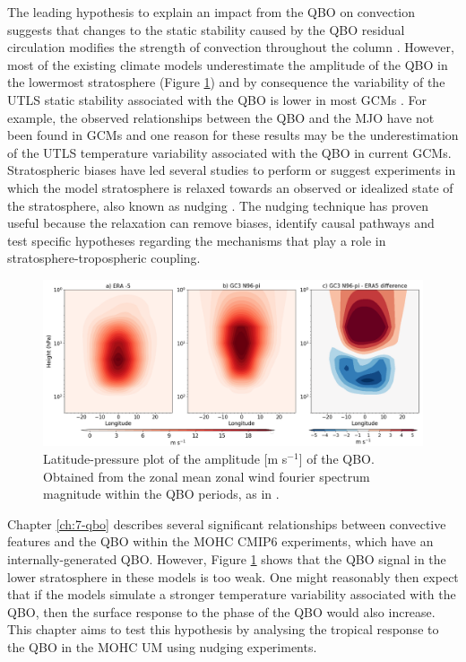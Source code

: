   
The leading hypothesis to explain an impact from the QBO on convection suggests that changes to the  static stability caused by the QBO residual circulation modifies the strength of convection throughout the column \citep{collimore2003,liess2012,nie2015}. 
However, most of the existing climate models underestimate the amplitude of the QBO in the lowermost stratosphere (Figure \ref{fig:qboamplitude}) and by consequence the variability of the UTLS static stability associated with the QBO is lower in most GCMs \citep{schenzinger2017,richter2020,bushell2020}. 
  For example, the observed relationships between the QBO and the MJO have not been found in GCMs \citep{lee2018,kim2020} and one reason for these results may be the underestimation of the UTLS temperature variability associated with the QBO in current GCMs.
   Stratospheric biases have led several studies to perform or suggest experiments in which the model stratosphere is relaxed towards an observed or idealized  state of the stratosphere, also known as nudging \citep[e.g.][]{garfinkel2011,lee2018,gray2020,richter2020,martin2021}. 
The nudging technique has proven useful because the relaxation can remove biases, identify causal pathways and test specific hypotheses regarding the mechanisms that play a role in stratosphere-tropospheric coupling. 

\begin{figure}[t!]
\centering
 \includegraphics[width=\linewidth]{figures/qboamplitude.png}
\caption[QBO amplitude bias]{Latitude-pressure plot of the amplitude [m s$^{-1}$] of the QBO. Obtained from the zonal mean zonal wind fourier spectrum magnitude within the QBO periods, as in \cite{schenzinger2017}. }
\label{fig:qboamplitude}
\end{figure}  

Chapter \ref{ch:7-qbo} describes several significant relationships between convective features and the QBO within the MOHC CMIP6 experiments, which have an internally-generated QBO. 
However, Figure \ref{fig:qboamplitude} shows that the QBO signal in the lower stratosphere in these models is too weak. %
One might reasonably then expect that if the models simulate a stronger temperature variability associated with the QBO, then the surface response to the phase of the QBO would also increase. 
This chapter aims to test this hypothesis by analysing the tropical response to the QBO in the MOHC UM using nudging experiments.

